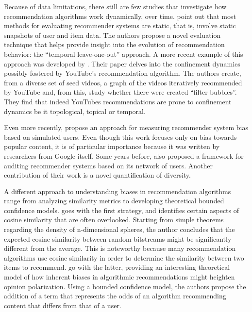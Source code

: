 Because of data limitations, there still are few studies that investigate how
recommendation algorithms work dynamically, over time.
\citet{burke_evaluating_2010} point out that most methods for evaluating
recommender systems are static, that is, involve static snapshots of user and
item data. The authors propose a novel evaluation technique that helps provide
insight into the evolution of recommendation behavior: the ``temporal
leave-one-out'' approach. A more recent example of this approach was developed
by \citet{roth_tubes_2020}. Their paper delves into the confinement dynamics
possibly fostered by YouTube's recommendation algorithm. The authors create,
from a diverse set of seed videos, a graph of the videos iteratively recommended
by YouTube and, from this, study whether there were created ``filter bubbles''.
They find that indeed YouTubes recommendations are prone to confinement dynamics
be it topological, topical or temporal.

Even more recently, \citet{yao_measuring_2021} propose an approach for measuring
recommender system bias based on simulated users. Even though this work focuses
only on bias towards popular content, it is of particular importance because it
was written by researchers from Google itself. Some years before,
\citet{dash_network-centric_2019} also proposed a framework for auditing
recommender systems based on its network of users. Another contribution of their
work is a novel quantification of diversity.

A different approach to understanding biases in recommendation algorithms range
from analyzing similarity metrics to developing theoretical bounded confidence
models. \citet{giller_statistical_2012} goes with the first strategy, and
identifies certain aspects of cosine similarity that are often overlooked.
Starting from simple theorems regarding the density of n-dimensional spheres,
the author concludes that the expected cosine similarity between random
bitstreams might be significantly different from the average. This is noteworthy
because many recommendation algorithms use cosine similarity in order to
determine the similarity between two items to recommend.
\citet{sirbu_algorithmic_2019} go with the latter, providing an interesting
theoretical model of how inherent biases in algorithmic recommendations might
heighten opinion polarization. Using a bounded confidence model, the authors
propose the addition of a term that represents the odds of an algorithm
recommending content that differs from that of a user.

